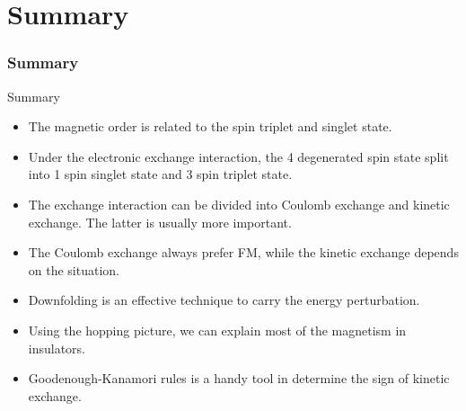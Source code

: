 \documentclass{beamer}
\begin{document}
  \section{Summary}

  \begin{frame}
    \frametitle{Summary}
    \begin{block}{Summary}
      \begin{itemize}
        \item The magnetic order is related to the spin triplet and singlet state.
        \item Under the electronic exchange interaction, the 4 degenerated spin state split into 1 spin singlet state and 3 spin triplet state.
        \item The exchange interaction can be divided into Coulomb exchange and kinetic exchange. The latter is usually more important.
        \item The Coulomb exchange always prefer FM, while the kinetic exchange depends on the situation.
        \item Downfolding is an effective technique to carry the energy perturbation.
        \item Using the hopping picture, we can explain most of the 
        magnetism in insulators.
        \item Goodenough-Kanamori rules is a handy tool in determine the sign of kinetic exchange.
      \end{itemize}
    \end{block}
  \end{frame}
\end{document}
